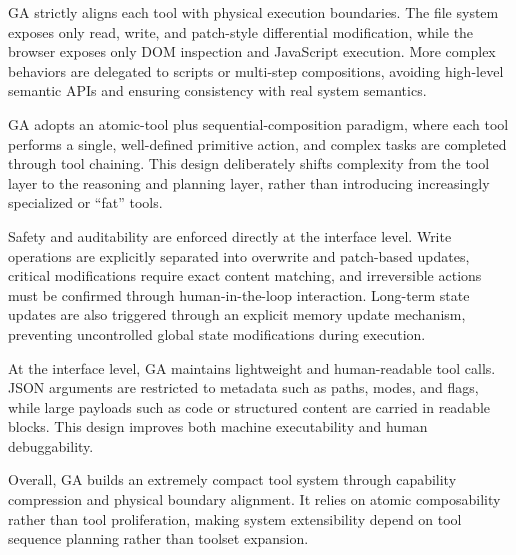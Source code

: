 GA strictly aligns each tool with physical execution boundaries. The file system exposes only read, write, and patch-style differential modification, while the browser exposes only DOM inspection and JavaScript execution. More complex behaviors are delegated to scripts or multi-step compositions, avoiding high-level semantic APIs and ensuring consistency with real system semantics.

GA adopts an atomic-tool plus sequential-composition paradigm, where each tool performs a single, well-defined primitive action, and complex tasks are completed through tool chaining. This design deliberately shifts complexity from the tool layer to the reasoning and planning layer, rather than introducing increasingly specialized or “fat” tools.

Safety and auditability are enforced directly at the interface level. Write operations are explicitly separated into overwrite and patch-based updates, critical modifications require exact content matching, and irreversible actions must be confirmed through human-in-the-loop interaction. Long-term state updates are also triggered through an explicit memory update mechanism, preventing uncontrolled global state modifications during execution.

At the interface level, GA maintains lightweight and human-readable tool calls. JSON arguments are restricted to metadata such as paths, modes, and flags, while large payloads such as code or structured content are carried in readable blocks. This design improves both machine executability and human debuggability.

Overall, GA builds an extremely compact tool system through capability compression and physical boundary alignment. It relies on atomic composability rather than tool proliferation, making system extensibility depend on tool sequence planning rather than toolset expansion.

